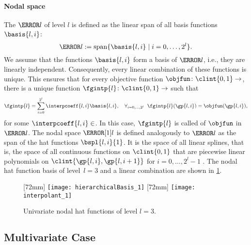 \paragraph{Nodal space}

The  $\ns{l}$ of level $l$
is defined as the linear span of all basis functions
$\basis{l,i}$:
\begin{equation}
  \ns{l} := \spn\{\basis{l,i} \mid i = 0, \dotsc, 2^l\}.
\end{equation}
We assume that the functions $\basis{l,i}$ form a basis of $\ns{l}$, i.e.,
they are linearly independent.
Consequently, every linear combination of these functions is unique.
This ensures that for every objective function $\objfun\colon \clint{0, 1} \to \real$,
there is a unique function $\fgintp{l}\colon \clint{0, 1} \to \real$ such that
\begin{equation}
  \label{eq:interpFullGridUV}
  \fgintp{l}
  = \sum_{i=0}^{2^l} \interpcoeff{l,i} \basis{l,i},\quad
  \falarge{i = 0, \dotsc, 2^l}{\fgintp{l}(\gp{l,i}) = \objfun(\gp{l,i})},
\end{equation}
for some $\interpcoeff{l,i} \in \real$.
In this case, $\fgintp{l}$ is called  of $\objfun$ in $\ns{l}$.
The nodal space $\nsbspl{l}{1}$ is defined analogously to $\ns{l}$
as the span of the hat functions $\bspl{l,i}{1}$.
It is the space of all linear splines,
that is, the space of all continuous functions on $\clint{0, 1}$ that are
piecewise linear polynomials on $\clint{\gp{l,i}, \gp{l,i+1}}$ for
$i = 0, \dotsc, 2^l - 1$ \cite{Hoellig13Approximation}.
The nodal hat function basis of level~$l = 3$
and a linear combination are shown in \cref{fig:nodalHat}.

\begin{figure}
  [72mm]{%
    \texttt{[image: hierarchicalBasis\_1]}%
  }%
  \hfill%
  [72mm]{%
    \texttt{[image: interpolant\_1]}%
  }%
  \caption[%
    Univariate nodal hat functions%
  ]{%
    Univariate nodal hat functions of level $l = 3$.%
  }%
  \label{fig:nodalHat}%
\end{figure}



\subsection{Multivariate Case}
\label{sec:212nodalMV}

